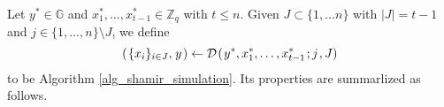 \documentclass{iacrtrans}
\begin{document}
Let $y^* \in \mathbb{G}$ and
$x_1^*, \dots, x_{t-1}^* \in \mathbb{Z}_q$ with $t \le n$.
Given $J \subset \{1, \dots n\}$ with $|J| = t-1$
and $j \in \{1, \dots, n\} \setminus J$,
we define
\vspace{5pt}
\begin{equation}\label{shamir_embedding_ref}
(\hspace{1pt}\{x_i\}_{i \in J},\hspace{1pt} y\hspace{1pt})
\leftarrow
\mathcal{D}\hspace{1pt}(
	\hspace{1pt}y^*,
	x_1^*, \dots, x_{t-1}^*
	\hspace{1pt};
	j\hspace{1pt},
	J
)
\vspace{0pt}
\end{equation}
to be Algorithm \ref{alg_shamir_simulation}.
Its properties are summarlized as follows.
\end{document}
